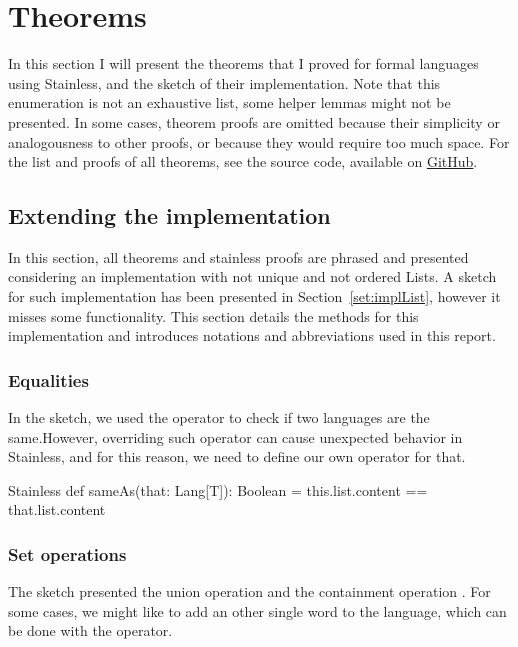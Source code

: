 \section{Theorems}

In this section I will present the theorems that I proved for formal languages using Stainless, and the sketch of their implementation. Note that this enumeration is not an exhaustive list, some helper lemmas might not be presented. In some cases, theorem proofs are omitted because their simplicity or analogousness to other proofs, or because they would require too much space. For the list and proofs of all theorems, see the source code, available on \href{https://github.com/czipobence/semesterProject-2017-autumn-assignments/tree/master/FormalLanguages}{GitHub}.

\subsection{Extending the implementation}

In this section, all theorems and stainless proofs are phrased and presented considering an implementation with not unique and not ordered Lists. A sketch for such implementation has been presented in Section~\ref{set:implList}, however it misses some functionality. This section details the methods for this implementation and introduces notations and abbreviations used in this report.

\subsubsection{Equalities}

In the sketch, we used the \inline{==} operator to check if two languages are the same.However, overriding such operator can cause unexpected behavior in Stainless, and for this reason, we need to define our own operator for that.

\begin{ShortCode}{Stainless}
 def sameAs(that: Lang[T]): Boolean = {
   this.list.content == that.list.content
 }
\end{ShortCode}

\subsubsection{Set operations}

The sketch presented the union operation \inline{++} and the containment operation . For some cases, we might like to add an other single word to the language, which can be done with the \inline{::} operator.

